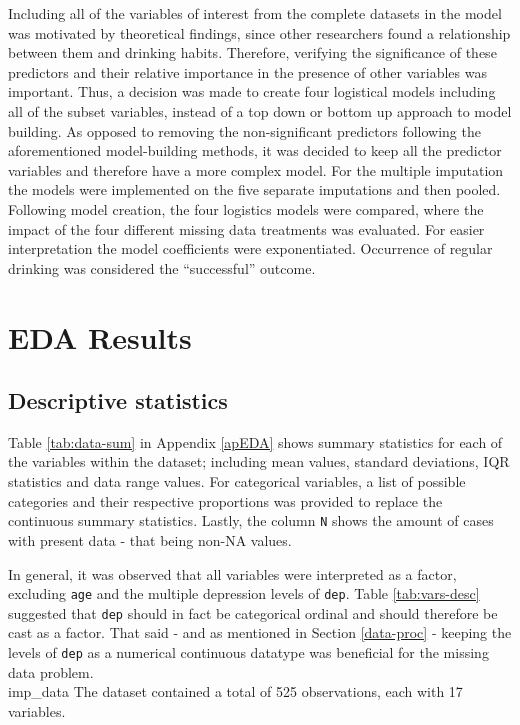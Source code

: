 \documentclass[
]{article}
\begin{document}
Including all of the variables of interest from the complete datasets in the model was motivated by theoretical findings, since other researchers found a relationship between them and drinking habits. Therefore, verifying the significance of these predictors and their relative importance in the presence of other variables was important. Thus, a decision was made to create four logistical models including all of the subset variables, instead of a top down or bottom up approach to model building. As opposed to removing the non-significant predictors following the aforementioned model-building methods, it was decided to keep all the predictor variables and therefore have a more complex model. For the multiple imputation the models were implemented on the five separate imputations and then pooled. Following model creation, the four logistics models were compared, where the impact of the four different missing data treatments was evaluated. For easier interpretation the model coefficients were exponentiated. Occurrence of regular drinking was considered the ``successful'' outcome.

\hypertarget{EDA}{%
\section{EDA Results}\label{EDA}}

\hypertarget{desc-stats}{%
\subsection{Descriptive statistics}\label{desc-stats}}

Table \ref{tab:data-sum} in Appendix \ref{apEDA} shows summary statistics for each of the variables within the dataset; including mean values, standard deviations, IQR statistics and data range values. For categorical variables, a list of possible categories and their respective proportions was provided to replace the continuous summary statistics. Lastly, the column \texttt{N} shows the amount of cases with present data - that being non-NA values.

In general, it was observed that all variables were interpreted as a factor, excluding \texttt{age} and the multiple depression levels of \texttt{dep}. Table \ref{tab:vars-desc} suggested that \texttt{dep} should in fact be categorical ordinal and should therefore be cast as a factor. That said - and as mentioned in Section \ref{data-proc} - keeping the levels of \texttt{dep} as a numerical continuous datatype was beneficial for the missing data problem.\\
imp\_data
The dataset contained a total of 525 observations, each with 17 variables.
\end{document}
